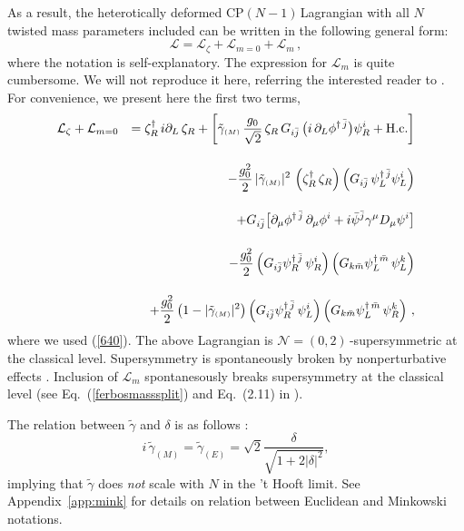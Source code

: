 \documentclass[epsfig,12pt]{article}
\def\beq{\begin{equation}}
\def\eeq{\end{equation}}
\def\beqn{\begin{eqnarray}}
\def\eeqn{\end{eqnarray}}
\newcommand{\nzt}{${\mathcal N}=(0,2)\,$}
\newcommand{\cpn}{CP$(N-1)\,$}
\newcommand{\cell}{{\mathcal L}}
\def\beqn{\begin{eqnarray}}
\def\eeqn{\end{eqnarray}}
\def\beq{\begin{equation}}
\def\eeq{\end{equation}}
\newcommand{\ssm}{{\scriptscriptstyle(M)}}
\begin{document}
{ As a result, the heterotically deformed \cpn Lagrangian with all $N$ twisted mass parameters included
can be written in the following general form:
 \beq
 \cell = \cell_\zeta + \cell_{m=0} +\cell_m\,,
 \label{tftpi3}
 \eeq
 where the notation is self-explanatory. The expression for $\cell_m$ is quite cumbersome.
 We will not reproduce it here, referring the interested reader to \cite{BSY3}.
 For convenience, we present here the first two terms,
\beqn
\cell_\zeta + \cell_{m=0} && 
= 
\zeta_R^\dagger \, i\partial_L \, \zeta_R  + 
\left[\tilde\gamma_\ssm\, \frac{g_0}{\sqrt 2} \, \zeta_R  \, 
      G_{i\bar j}\,  \big( i\,\partial_{L}\phi^{\dagger\,\bar j} \big)\psi_R^i
      + {\rm H.c.}\right]
\nonumber
\\[4mm]
&&
 -\frac{g_0^2}{2}\, |\tilde\gamma_\ssm |^2 \,\left(\zeta_R^\dagger\, \zeta_R
\right)\left(G_{i\bar j}\,  \psi_L^{\dagger\,\bar j}\psi_L^i\right)
\nonumber
\\[4mm]
&&
+G_{i\bar j} \big[\partial_\mu \phi^{\dagger\,\bar j}\, \partial_\mu\phi^{i}
+i\bar \psi^{\bar j} \gamma^{\mu} D_{\mu}\psi^{i}\big]
\nonumber
\\[4mm]
&&
- \frac{g_0^2}{2}\left( G_{i\bar j}\psi^{\dagger\, \bar j}_R\, \psi^{ i}_R\right)
\left( G_{k\bar m}\psi^{\dagger\, \bar m}_L\, \psi^{ k}_L\right)
\nonumber
\\[4mm]
&&
+\frac{g_0^2}{2}\left(1-|\tilde\gamma_\ssm|^2\right)
\left( G_{i\bar j}\psi^{\dagger\, \bar j}_R\, \psi^{ i}_L\right)
\left( G_{k\bar m}\psi^{\dagger\, \bar m}_L\, \psi^{ k}_R\right)\,,
\label{cpn-1g}
\eeqn
where we used (\ref{640}). The above Lagrangian is \nzt-supersymmetric at the classical level.
Supersymmetry is spontaneously broken by nonperturbative effects \cite{EdTo,SYhet}. 
Inclusion of $\cell_m$ spontanesously breaks supersymmetry at the classical level (see
Eq.~(\ref{ferbosmasssplit}) and 
Eq.~(2.11) in \cite{BSY3}).

The relation between $\tilde\gamma$ and $\delta$
is as follows \cite{BSY3}:
\beq
  i\,\tilde\gamma_\ssm =
     \tilde\gamma_{\scriptscriptstyle(E)} = \sqrt{2} \frac{\delta}{\sqrt{1+ 2 |\delta |^2}},
\label{tftpi4}
\eeq
implying that $\tilde \gamma$ does {\em not} scale with $N$ in the 't Hooft limit.
See Appendix~\ref{app:mink} for details on relation between Euclidean and Minkowski notations. 


\newpage
{}



\small
\begin{thebibliography}{99}
\itemsep -2pt


\end{thebibliography}}
\end{document}
